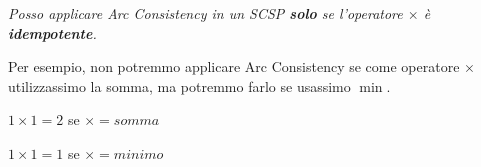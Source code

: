 \begin{center}
    \textit{Posso applicare Arc Consistency in un SCSP \textbf{solo} se l'operatore $\times$ è
        \textbf{idempotente}.}
\end{center}

Per esempio, non potremmo applicare Arc Consistency se come operatore $\times$
utilizzassimo la somma, ma potremmo farlo se usassimo $\min$.

\begin{center}
    $1 \times 1 = 2$ se $\times = somma$
\end{center}
\begin{center}
    $1 \times 1 = 1$ se $\times = minimo$
\end{center}

